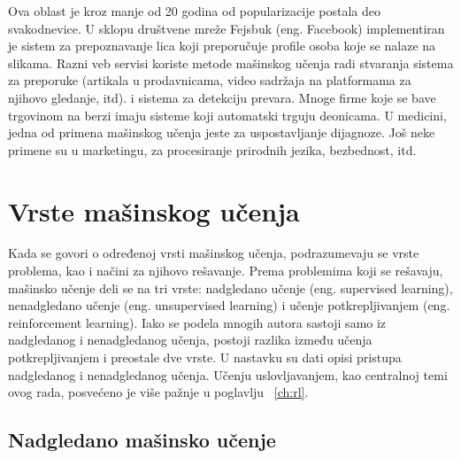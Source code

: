 Ova oblast je kroz manje od 20 godina od popularizacije postala deo svakodnevice. U sklopu društvene mreže Fejsbuk (eng. Facebook) implementiran je sistem za prepoznavanje lica koji preporučuje profile osoba koje se nalaze na slikama. Razni veb servisi koriste metode mašinskog učenja radi stvaranja sistema za preporuke (artikala u prodavnicama, video sadržaja na platformama za njihovo gledanje, itd). i sistema za detekciju prevara. Mnoge firme koje se bave trgovinom na berzi imaju sisteme koji automatski trguju deonicama. U medicini, jedna od primena mašinskog učenja jeste za uspostavljanje dijagnoze. Još neke primene su u marketingu, za procesiranje prirodnih jezika, bezbednost, itd.


\section{Vrste mašinskog učenja}

Kada se govori o određenoj vrsti mašinskog učenja, podrazumevaju se vrste problema, kao i načini za njihovo rešavanje. Prema problemima koji se rešavaju, mašinsko učenje deli se na tri vrste: nadgledano učenje (eng. supervised learning), nenadgledano učenje (eng. unsupervised learning) i učenje potkrepljivanjem (eng. reinforcement learning). Iako se podela mnogih autora sastoji samo iz nadgledanog i nenadgledanog učenja, postoji razlika između učenja potkrepljivanjem i preostale dve vrste. U nastavku su dati opisi pristupa nadgledanog i nenadgledanog učenja. Učenju uslovljavanjem, kao centralnoj temi ovog rada, posvećeno je više pažnje u poglavlju~ \ref{ch:rl}. 

\subsection{Nadgledano mašinsko učenje}

